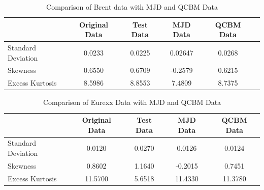 \documentclass[12pt]{article}
\numberwithin{equation}{section}
\begin{document}
\begin{table}[h!]
\centering
\begin{tabular}{lccccc}
\hline
\textbf{} & \textbf{Original Data} & \textbf{Test Data} & \textbf{MJD Data} & \textbf{QCBM Data} \\
\hline 
Standard Deviation & 0.0233 &0.0225 & 0.02647 & 0.0268   \\
Skewness            & 0.6550 &0.6709 & -0.2579 & 0.6215 \\
Excess Kurtosis     & 8.5986 &8.8553 & 7.4809 & 8.7375  \\
\hline
\end{tabular}
\caption{Comparison of Brent data with MJD and QCBM Data}
\label{tab:brentdata}
\end{table}


\begin{table}[h!]
\centering
\begin{tabular}{lcccc}
\hline
\textbf{} & \textbf{Original Data} & \textbf{Test Data} & \textbf{MJD Data} & \textbf{QCBM Data} \\
\hline 
Standard Deviation  & 0.0120  & 0.0270  & 0.0126  & 0.0124 \\
Skewness            & 0.8602  & 1.1640  & -0.2015 & 0.7451 \\
Excess Kurtosis     & 11.5700 & 5.6518  & 11.4330 & 11.3780 \\
\hline
\end{tabular}
\caption{Comparison of Eurexx Data with MJD and QCBM Data}
\label{tab:eurexxdata}
\end{table}
\end{document}
